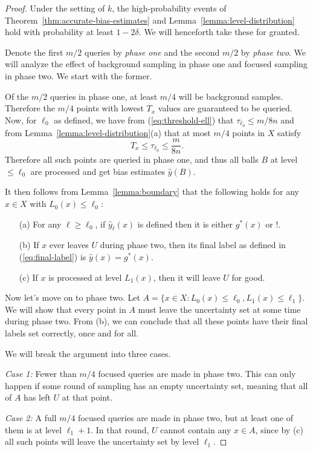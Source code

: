 \documentclass[anon,12pt]{colt2022} %
\def\yh{{\widehat{y}}}
\begin{document}
\begin{proof}
Under the setting of $k$, the high-probability events of Theorem~\ref{thm:accurate-bias-estimates} and Lemma~\ref{lemma:level-distribution} hold with probability at least $1-2\delta$. We will henceforth take these for granted.

Denote the first $m/2$ queries by {\it phase one} and the second $m/2$ by {\it phase two}. We will analyze the effect of background sampling in phase one and focused sampling in phase two. We start with the former.

Of the $m/2$ queries in phase one, at least $m/4$ will be background samples. Therefore the $m/4$ points with lowest $T_x$ values are guaranteed to be queried. Now, for $\ell_0$ as defined, we have from (\ref{eq:threshold-ell}) that $\tau_{\ell_0} \leq m/8n$ and from Lemma~\ref{lemma:level-distribution}(a) that at most $m/4$ points in $X$ satisfy
$$ T_x \leq \tau_{\ell_0} \leq \frac{m}{8n}.$$
Therefore all such points are queried in phase one, and thus all balls $B$ at level $\leq \ell_0$ are processed and get bias estimates $\yh(B)$.

It then follows from Lemma~\ref{lemma:boundary} that the following holds for any $x \in X$ with $L_0(x) \leq \ell_0$:
\begin{enumerate}
\item[(a)] For any $\ell \geq \ell_0$, if $\yh_\ell(x)$ is defined then it is either $g^*(x)$ or $!$.
\item[(b)] If $x$ ever leaves $U$ during phase two, then its final label as defined in (\ref{eq:final-label}) is $\yh(x) = g^*(x)$.
\item[(c)] If $x$ is processed at level $L_1(x)$, then it will leave $U$ for good.
\end{enumerate}

Now let's move on to phase two. Let $A = \{x \in X: L_0(x) \leq \ell_0, L_1(x) \leq \ell_1\}$. We will show that every point in $A$ must leave the uncertainty set at some time during phase two. From (b), we can conclude that all these points have their final labels set correctly, once and for all.

We will break the argument into three cases. 

{\it Case 1:} Fewer than $m/4$ focused queries are made in phase two. This can only happen if some round of sampling has an empty uncertainty set, meaning that all of $A$ has left $U$ at that point.

{\it Case 2:} A full $m/4$ focused queries are made in phase two, but at least one of them is at level $\ell_1 + 1$. In that round, $U$ cannot contain any $x \in A$, since by (c) all such points will leave the uncertainty set by level $\ell_1$.


\end{proof}
\end{document}
